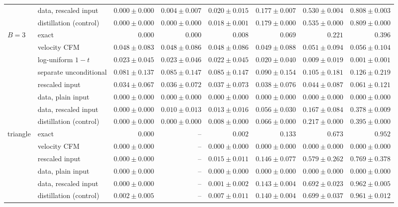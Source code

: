 \documentclass{article} %
\theoremstyle{plain}
\theoremstyle{definition}
\theoremstyle{remark}
\begin{document}
\begin{table}[htb]
{\begin{tabular}{@{}llrrrrrr@{}}
 & data, rescaled input & $0.000\pm0.000$ & $0.004\pm0.007$ & $0.020\pm0.015$ & $0.177\pm0.007$ & $0.530\pm0.004$ & $0.808\pm0.003$\\
 & distillation (control) & $0.000\pm0.000$ & $0.000\pm0.000$ & $0.018\pm0.001$ & $0.179\pm0.000$ & $0.535\pm0.000$ & $0.809\pm0.000$\\
\midrule
$B=3$ & exact & $0.000$ & $0.000$ & $0.008$ & $0.069$ & $0.221$ & $0.396$\\
 & velocity CFM & $0.048\pm0.083$ & $0.048\pm0.086$ & $0.048\pm0.086$ & $0.049\pm0.088$ & $0.051\pm0.094$ & $0.056\pm0.104$\\
 & \quad log-uniform $1-t$ & $0.023\pm0.045$ & $0.023\pm0.046$ & $0.022\pm0.045$ & $0.020\pm0.040$ & $0.009\pm0.019$ & $0.001\pm0.001$\\
 & \quad separate unconditional & $0.081\pm0.137$ & $0.085\pm0.147$ & $0.085\pm0.147$ & $0.090\pm0.154$ & $0.105\pm0.181$ & $0.126\pm0.219$\\
 & \quad rescaled input & $0.034\pm0.067$ & $0.036\pm0.072$ & $0.037\pm0.073$ & $0.038\pm0.076$ & $0.044\pm0.087$ & $0.061\pm0.121$\\
 & data, plain input & $0.000\pm0.000$ & $0.000\pm0.000$ & $0.000\pm0.000$ & $0.000\pm0.000$ & $0.000\pm0.000$ & $0.000\pm0.000$\\
 & data, rescaled input & $0.000\pm0.000$ & $0.010\pm0.013$ & $0.013\pm0.016$ & $0.056\pm0.030$ & $0.167\pm0.084$ & $0.378\pm0.009$\\
 & distillation (control) & $0.000\pm0.000$ & $0.000\pm0.000$ & $0.008\pm0.000$ & $0.066\pm0.000$ & $0.217\pm0.000$ & $0.395\pm0.000$\\
\midrule
triangle & exact & $0.000$ & -- & $0.002$ & $0.133$ & $0.673$ & $0.952$\\
 & velocity CFM & $0.000\pm0.000$ & -- & $0.000\pm0.000$ & $0.000\pm0.000$ & $0.000\pm0.000$ & $0.000\pm0.000$\\
 & \quad rescaled input & $0.000\pm0.000$ & -- & $0.015\pm0.011$ & $0.146\pm0.077$ & $0.579\pm0.262$ & $0.769\pm0.378$\\
 & data, plain input & $0.000\pm0.000$ & -- & $0.000\pm0.000$ & $0.000\pm0.000$ & $0.000\pm0.000$ & $0.000\pm0.000$\\
 & data, rescaled input & $0.000\pm0.000$ & -- & $0.001\pm0.002$ & $0.143\pm0.004$ & $0.692\pm0.023$ & $0.962\pm0.005$\\
 & distillation (control) & $0.002\pm0.005$ & -- & $0.007\pm0.011$ & $0.140\pm0.004$ & $0.699\pm0.037$ & $0.961\pm0.012$\\

\end{tabular}}
\end{table}
\end{document}

